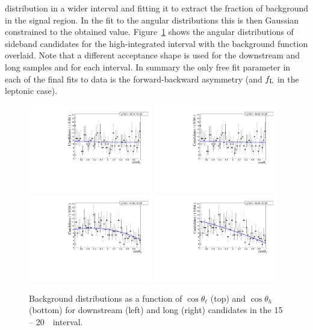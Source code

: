 distribution in a wider interval and fitting it to extract the fraction of background in the signal region.
In the fit to the angular distributions this is then Gaussian constrained to the obtained value.
%
Figure~\ref{fig:cosThetaLbkg} shows the angular distributions of sideband candidates
for the high-\qsq integrated interval with the background function overlaid.
Note that a different acceptance shape is used for the downstream and long samples and for each \qsq interval.
%
In summary the only free fit parameter in each of the final fits to data is the forward-backward asymmetry
(and $f_{\rm L}$ in the leptonic case). 
%
\begin{figure}[h]
\centering
\includegraphics[width=0.48\textwidth]{Lmumu/figs/AngularBkgFits/BkgFit_highq2_DD.pdf}
\includegraphics[width=0.48\textwidth]{Lmumu/figs/AngularBkgFits/BkgFit_highq2_LL.pdf}
\includegraphics[width=0.48\textwidth]{Lmumu/figs/AngularBkgFits/BkgFitB_highq2_DD.pdf}
\includegraphics[width=0.48\textwidth]{Lmumu/figs/AngularBkgFits/BkgFitB_highq2_LL.pdf}
\caption{Background distributions as a function of $\cos\theta_\ell$ (top) and $\cos\theta_h$ (bottom)
for downstream (left) and long (right) candidates in the 15 -- 20~\gevgevcccc ~\qsq interval.  }
\label{fig:cosThetaLbkg}
\end{figure}

